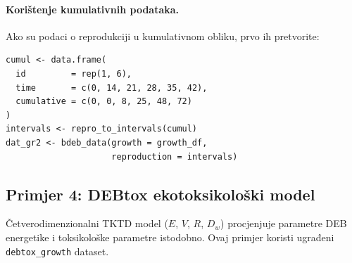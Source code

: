 \documentclass[11pt,a4paper]{article}
\newcommand{\code}[1]{\texttt{#1}}
\begin{document}
\paragraph{Korištenje kumulativnih podataka.}
Ako su podaci o reprodukciji u kumulativnom obliku, prvo ih pretvorite:
\begin{lstlisting}
cumul <- data.frame(
  id         = rep(1, 6),
  time       = c(0, 14, 21, 28, 35, 42),
  cumulative = c(0, 0, 8, 25, 48, 72)
)
intervals <- repro_to_intervals(cumul)
dat_gr2 <- bdeb_data(growth = growth_df,
                     reproduction = intervals)
\end{lstlisting}


\subsection{Primjer 4: DEBtox ekotoksikološki model}
\label{sec:primjer-debtox}

Četverodimenzionalni TKTD model ($E$, $V$, $R$, $D_w$) procjenjuje
parametre DEB energetike i toksikološke parametre istodobno.  Ovaj
primjer koristi ugrađeni \code{debtox\_growth} dataset.
\end{document}

